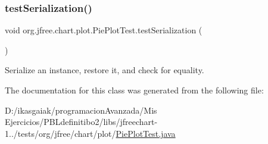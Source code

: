 \subsubsection{\texorpdfstring{test\+Serialization()}{testSerialization()}}
{\footnotesize\ttfamily void org.\+jfree.\+chart.\+plot.\+Pie\+Plot\+Test.\+test\+Serialization (\begin{DoxyParamCaption}{ }\end{DoxyParamCaption})}

Serialize an instance, restore it, and check for equality. 

The documentation for this class was generated from the following file\+:\begin{DoxyCompactItemize}
\item 
D\+:/ikasgaiak/programacion\+Avanzada/\+Mis Ejercicios/\+P\+B\+Ldefinitibo2/libs/jfreechart-\/1../tests/org/jfree/chart/plot/\mbox{\hyperlink{_pie_plot_test_8java}{Pie\+Plot\+Test.\+java}}\end{DoxyCompactItemize}
